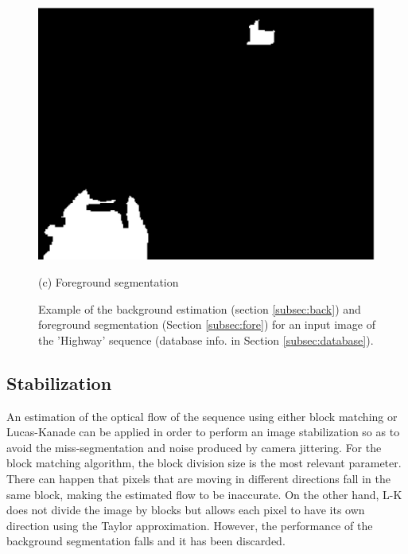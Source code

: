 \documentclass{article}
\begin{document}
\begin{figure}[htb]
\begin{minipage}[b]{.48\linewidth}
\end{minipage}
\hfill
\begin{minipage}[b]{0.48\linewidth}
  \centering
  \centerline{\includegraphics[width=\textwidth]{fig/block2}}
  \centerline{(c) Foreground segmentation}\medskip
\end{minipage}
%
\caption{Example of the background estimation (section \ref{subsec:back}) and foreground segmentation (Section \ref{subsec:fore}) for an input image of the 'Highway' sequence (database info. in Section \ref{subsec:database}).}
\label{fig:res}
%
\end{figure}

\subsection{Stabilization}

An estimation of the optical flow of the sequence using either block matching or Lucas-Kanade \cite{lucas1981iterative} can be applied in order to perform an image stabilization so as to avoid the miss-segmentation and noise produced by camera jittering. For the block matching algorithm, the block division size is the most relevant parameter. There can happen that pixels that are moving in different directions fall in the same block, making the estimated flow to be inaccurate. On the other hand, L-K does not divide the image by blocks but allows each pixel to have its own direction using the Taylor approximation.
However, the performance of the background segmentation falls and it has been discarded.
\end{document}
